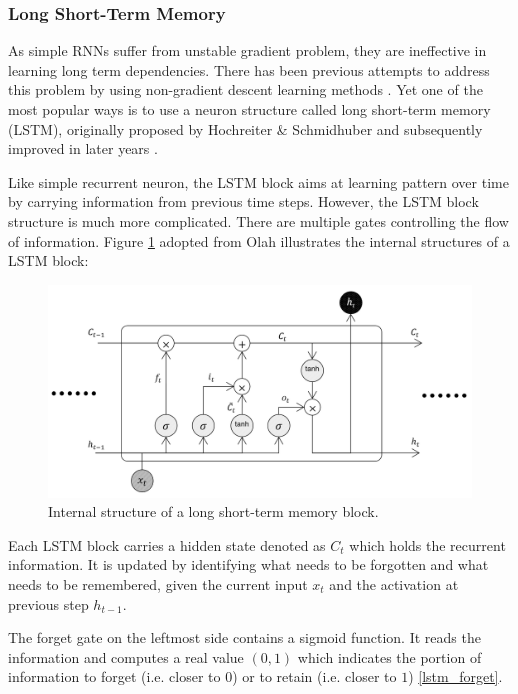 \documentclass[11pt]{article} %
\theoremstyle{plain}
\theoremstyle{definition}
\begin{document}
\subsubsection{Long Short-Term Memory}

As simple RNNs suffer from unstable gradient problem, they are ineffective in learning long term dependencies. There has been previous attempts to address this problem by using non-gradient descent learning methods \cite{bengio1994}. Yet one of the most popular ways is to use a neuron structure called long short-term memory (LSTM), originally proposed by Hochreiter \& Schmidhuber \cite{hochreiter1997} and subsequently improved in later years \cite{gers2000, gers2003, graves2012}.

Like simple recurrent neuron, the LSTM block aims at learning pattern over time by carrying information from previous time steps. However, the LSTM block structure is much more complicated. There are multiple gates controlling the flow of information. Figure \ref{fig:lstm} adopted from Olah \cite{olah} illustrates the internal structures of a LSTM block:


\begin{figure}[H]
	\centering
	\includegraphics[width=1\textwidth]{lstm.PNG}
	\caption{Internal structure of a long short-term memory block.}
	\label{fig:lstm}
\end{figure}


Each LSTM block carries a hidden state denoted as \(C_t\) which holds the recurrent information. It is updated by identifying what needs to be forgotten and what needs to be remembered, given the current input \(x_t\) and the activation at previous step \(h_{t-1}\).

The forget gate on the leftmost side contains a sigmoid function. It reads the information and computes a real value \((0,1)\) which indicates the portion of information to forget (i.e. closer to \(0\)) or to retain (i.e. closer to \(1\)) \eqref{lstm_forget}.
\end{document}

